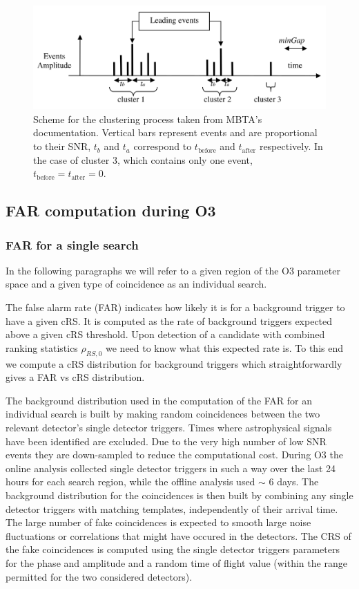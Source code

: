 \begin{figure}[ht]
  \centering
  \includegraphics[width=\textwidth]{sectionMBTA/clustering.png}
  \caption{Scheme for the clustering process taken from MBTA's documentation. Vertical bars represent events and are proportional to their SNR, $t_b$ and $t_a$ correspond to $t_{\textrm{before}}$ and $t_{\textrm{after}}$ respectively. In the case of cluster 3, which contains only one event, $t_{\textrm{before}} = t_{\textrm{after}} = 0$.}
  \label{fig:cluster}
\end{figure}




\subsection{FAR computation during O3}
\label{sec:far_coinc}
\subsubsection{FAR for a single search}

In the following paragraphs we will refer to a given region of the O3 parameter space and a given type of coincidence as an individual search.

The false alarm rate (FAR) indicates how likely it is for a background trigger to have a given cRS.
It is computed as the rate of background triggers expected above a given cRS threshold.
Upon detection of a candidate with combined ranking statistics $\rho_{RS,0}$ we need to know what this expected rate is.
To this end we compute a cRS distribution for background triggers which straightforwardly gives a FAR vs cRS distribution.

The background distribution used in the computation of the FAR for an individual search is built by making random coincidences between the two relevant detector's single detector triggers.
Times where astrophysical signals have been identified are excluded.
Due to the very high number of low SNR events they are down-sampled to reduce the computational cost.
During O3 the online analysis collected single detector triggers in such a way over the last 24 hours for each search region, while the offline analysis used $\sim$ 6 days.
The background distribution for the coincidences is then built by combining any single detector triggers with matching templates, independently of their arrival time.
The large number of fake coincidences is expected to smooth large noise fluctuations or correlations that might have occured in the detectors.
The CRS of the fake coincidences is computed using the single detector triggers parameters for the phase and amplitude and a random time of flight value (within the range permitted for the two considered detectors).

